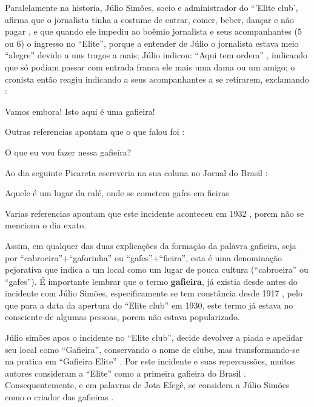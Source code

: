 Paralelamente na historia, Júlio Simões, socio e administrador do ``'Elite club', afirma que o jornalista tinha a costume de entrar, 
comer, beber, dançar e não pagar \cite[pp.13 ]{respeitojournalbrasil1},
e que quando ele impediu ao boêmio jornalista e seus acompanhantes (5 ou 6) o ingresso no ``Elite'', 
porque a entender de Júlio o jornalista estava meio ``alegre'' devido a uns tragos a mais;
 Júlio indicou: ``Aqui tem ordem'' 
\cite[pp. 29]{instituto1987revista} \cite[pp.13 ]{respeitojournalbrasil1} \cite[pp. 6]{gafieiraaredeout2} \cite[pp. 3 - Encontro]{gafieiraaredeout1},
indicando que só podiam passar com entrada franca ele mais uma dama ou um amigo;
o cronista então reagiu indicando a seus acompanhantes a se retirarem, 
exclamando \cite[pp. 29]{instituto1987revista} \cite[pp. 6 - Tribuna Bis]{gafieiraaredeout3}: 
\begin{citando}
Vamos embora! Isto aqui é uma gafieira!
\end{citando}
Outras referencias apontam que o que falou foi \cite[pp. 6]{gafieiraaredeout2} \cite[pp. 3 - Encontro]{gafieiraaredeout1}:
\begin{citando}
O que eu vou fazer nessa gafieira?
\end{citando}
Ao dia seguinte Picareta escreveria na sua coluna no Jornal do Brasil \cite[pp. 188]{raca1999}:
\begin{citando}
Aquele é um lugar da ralé, onde se cometem gafes em fieiras
\end{citando}
Varias referencias apontam que este incidente aconteceu em 1932 \cite[pp. 3 - Encontro]{gafieiraaredeout1} \cite[pp. 188]{raca1999}, 
porem não se menciona o dia exato. 




Assim, em qualquer das duas explicações da formação da palavra gafieira,
seja por ``cabroeira''+``gaforinha'' ou ``gafes''+``fieira'',
esta é uma denominação pejorativa que indica a um local 
como um lugar de pouca cultura (``cabroeira'' ou ``gafes'').
É importante lembrar que o termo \textbf{gafieira}, já existia desde antes do 
incidente com Júlio Simões, especificamente se tem constância desde 1917 \cite[pp. 4]{oldgafieira1},
pelo que para a data da apertura do ``Elite club'' em 1930,
este termo já estava no consciente de algumas pessoas, porem não estava popularizado.

Júlio simões apos o incidente no ``Elite club'', 
decide devolver a piada e apelidar seu local como 
``Gafieira'', conservando o nome de clube, 
mas transformando-se na pratica em ``Gafieira Elite'' \cite[pp. 79]{moura1995tia} \cite[pp. 6 - Tribuna Bis]{gafieiraaredeout3}.
Por este incidente e suas repercussões, 
muitos autores consideram a ``Elite'' como a primeira gafieira do Brasil \cite{cabral2016elisete} \cite[pp. 84]{cabral1996escolas}.
Consequentemente, e em palavras de Jota Efegê, 
se considera a Júlio Simões como o criador das gafieiras \cite[pp. 3 - cad. 3]{juliosimoes}.

